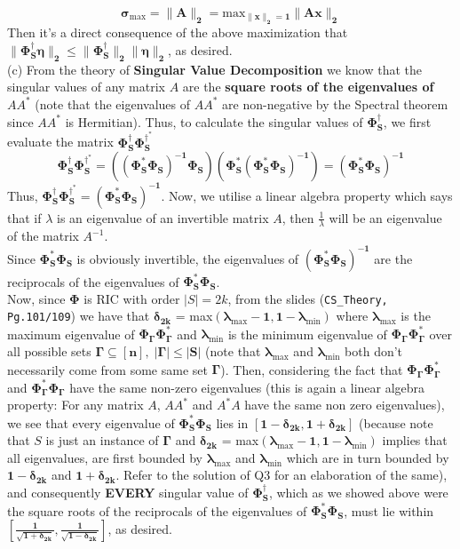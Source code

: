 \documentclass[a4paper,11pt]{article}
\numberwithin{definition}{section}
\numberwithin{mytheorem}{subsection}
\begin{document}
$$\boldsymbol{\sigma_{\mathrm{max}} = \lVert A\rVert_2 = \mathrm{max}_{\lVert x\rVert_2 = 1}\lVert Ax\rVert_2}$$
Then it's a direct consequence of the above maximization that $\boldsymbol{\lVert\Phi_S^{\dagger}\eta\rVert_2 \leq \lVert\Phi_S^{\dagger}\rVert_2\lVert\eta\rVert_2}$, as desired.
\\
(c) From the theory of \textbf{Singular Value Decomposition} we know that the singular values of any matrix $A$ are the \textbf{square roots of the eigenvalues of $AA^*$} (note that the eigenvalues of $AA^*$ are non-negative by the Spectral theorem since $AA^*$ is Hermitian). Thus, to calculate the singular values of $\boldsymbol{\Phi_S^{\dagger}}$, we first evaluate the matrix $\boldsymbol{\Phi_S^{\dagger}}\boldsymbol{\Phi_S^{\dagger^{*}}}$ 
$$\boldsymbol{\Phi_S^{\dagger}\Phi_S^{\dagger^{*}} = ((\Phi_S^*\Phi_S)^{-1}\Phi_S)(\Phi_S^*(\Phi_S^*\Phi_S)^{-1}) = (\Phi_S^*\Phi_S)^{-1}}$$
Thus, $\boldsymbol{\Phi_S^{\dagger}\Phi_S^{\dagger^{*}} = (\Phi_S^*\Phi_S)^{-1}}$. Now, we utilise a linear algebra property which says that if $\lambda$ is an eigenvalue of an invertible matrix $A$, then $\frac{1}{\lambda}$ will be an eigenvalue of the matrix $A^{-1}$. \\
Since $\boldsymbol{\Phi_S^*\Phi_S}$ is obviously invertible, the eigenvalues of $\boldsymbol{(\Phi_S^*\Phi_S)^{-1}}$ are the reciprocals of the eigenvalues of $\boldsymbol{\Phi_S^*\Phi_S}$.\\
Now, since $\boldsymbol{\Phi}$ is RIC with order $|S| = 2k$, from the slides (\texttt{CS\_Theory, Pg.101/109}) we have that $\boldsymbol{\delta_{2k}}$ = max$\boldsymbol{(\lambda_{\mathrm{max}}-1, 1-\lambda_{\mathrm{min}})}$ where $\boldsymbol{\lambda_{\mathrm{max}}}$ is the maximum eigenvalue of $\boldsymbol{\Phi_{\Gamma}\Phi_{\Gamma}^*}$ and $\boldsymbol{\lambda_{\mathrm{min}}}$ is the minimum eigenvalue of $\boldsymbol{\Phi_{\Gamma}\Phi_{\Gamma}^*}$ over all possible sets $\boldsymbol{\Gamma\subseteq[n],\;|\Gamma| \leq |S|}$ (note that $\boldsymbol{\lambda_{\mathrm{max}}}$ and $\boldsymbol{\lambda_{\mathrm{min}}}$ both don't necessarily come from some same set $\boldsymbol{\Gamma}$). Then, considering the fact that $\boldsymbol{\Phi_{\Gamma}\Phi_{\Gamma}^*}$ and $\boldsymbol{\Phi_{\Gamma}^*\Phi_{\Gamma}}$ have the same non-zero eigenvalues (this is again a linear algebra property: For any matrix $A$, $AA^*$ and $A^*A$ have the same non zero eigenvalues), we see that every eigenvalue of $\boldsymbol{\Phi_S^*\Phi_S}$ lies in $\boldsymbol{[1-\delta_{2k}, 1+\delta_{2k}]}$ (because note that $S$ is just an instance of $\boldsymbol{\Gamma}$ and  $\boldsymbol{\delta_{2k}}$ = max$\boldsymbol{(\lambda_{\mathrm{max}}-1, 1-\lambda_{\mathrm{min}})}$ implies that all eigenvalues, are first bounded by $\boldsymbol{\lambda_{\mathrm{max}}}$ and $\boldsymbol{\lambda_{\mathrm{min}}}$ which are in turn bounded by $\boldsymbol{1-\delta_{2k}}$ and $\boldsymbol{1+\delta_{2k}}$. Refer to the solution of Q3 for an elaboration of the same), and consequently \textbf{EVERY} singular value of $\boldsymbol{\Phi_S^{\dagger}}$, which as we showed above were the square roots of the reciprocals of the eigenvalues of $\boldsymbol{\Phi_S^*\Phi_S}$, must lie within $\boldsymbol{[\frac{1}{\sqrt{1+\delta_{2k}}}, \frac{1}{\sqrt{1-\delta_{2k}}}]}$, as desired.
\end{document}
